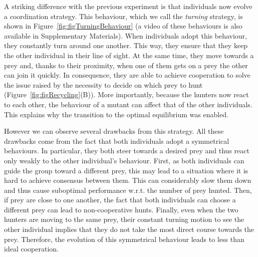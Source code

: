     A striking difference with the previous experiment is that individuals now evolve a coordination strategy. This behaviour, which we call the \emph{turning} strategy, is shown in Figure~\ref{fig:figTurningBehaviour} (a video of these behaviours is also available in Supplementary Materials). When individuals adopt this behaviour, they constantly turn around one another. This way, they ensure that they keep the other individual in their line of sight. At the same time, they move towards a prey and, thanks to their proximity, when one of them gets on a prey the other can join it quickly. In consequence, they are able to achieve cooperation to solve the issue raised by the necessity to decide on which prey to hunt (Figure~\ref{fig:figRecycling}(B)). More importantly, because the hunters now react to each other, the behaviour of a mutant can affect that of the other individuals. This explains why the transition to the optimal equilibrium was enabled.

    However we can observe several drawbacks from this strategy. All these drawbacks come from the fact that both individuals adopt a symmetrical behaviours. In particular, they both steer towards a desired prey and thus react only weakly to the other individual's behaviour. First, as both individuals can guide the group toward a different prey, this may lead to a situation where it is hard to achieve consensus between them. This can considerably slow them down and thus cause suboptimal performance w.r.t. the number of prey hunted. Then, if prey are close to one another, the fact that both individuals can choose a different prey can lead to non-cooperative hunts. Finally, even when the two hunters are moving to the same prey, their constant turning motion to see the other individual implies that they do not take the most direct course towards the prey. Therefore, the evolution of this symmetrical behaviour leads to less than ideal cooperation.

